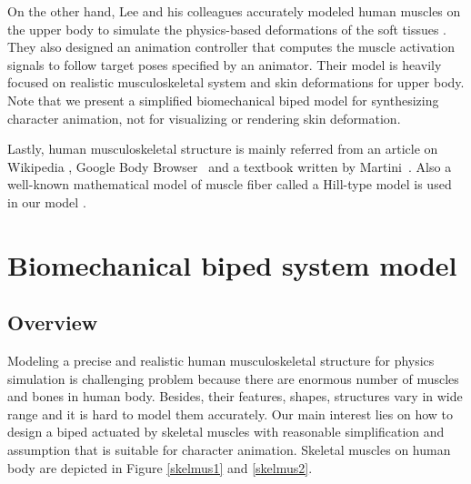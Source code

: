 \documentclass[master,english,final]{kaist-ucs}
\begin{document}
On the other hand, Lee and his colleagues accurately modeled human muscles on the upper body
to simulate the physics-based deformations of the soft tissues \cite{Lee:2009:CBM:1559755.1559756}.
They also designed an animation controller that computes the muscle activation signals to follow target poses
specified by an animator. Their model is heavily focused on realistic musculoskeletal
system and skin deformations for upper body.
Note that we present a simplified biomechanical biped model for synthesizing character animation,
not for visualizing or rendering skin deformation.

Lastly, human musculoskeletal structure is mainly referred from an article on Wikipedia \cite{Wikipedia},
Google Body Browser~\cite{bodybrowser} and a textbook written by Martini~\cite{martini}.
Also a well-known mathematical model of muscle fiber
called a Hill-type model is used in our model \cite{hill, Lee:2006:HUB:1141911.1142013}.





\chapter{Biomechanical biped system model}

\section{Overview}

Modeling a precise and realistic human musculoskeletal structure for physics simulation
is challenging problem because there are enormous number of muscles and bones in human body.
Besides, their features, shapes, structures vary in wide range and it is hard to
model them accurately.
Our main interest lies on how to design a biped actuated by skeletal muscles with reasonable
simplification and assumption that is suitable for character animation.
Skeletal muscles on human body are depicted in Figure \ref{skelmus1} and \ref{skelmus2}.
\end{document}
